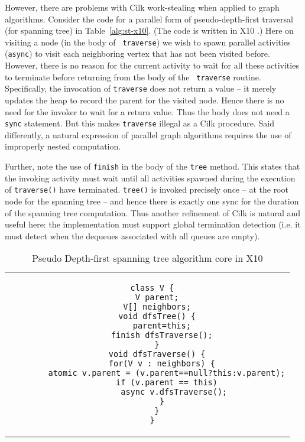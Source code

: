 \documentclass[10pt]{article}
\numberwithin{equation}{section}
\def\Xten{{\sf X10}}
\begin{document}
However, there are problems with Cilk work-stealing when applied to
graph algorithms. Consider the code for a parallel form of
pseudo-depth-first traversal (for spanning tree) in
Table~\ref{alg:st-x10}. (The code is written in \Xten{} \cite{x10}.)
Here on visiting a node (in the body of {\tt
traverse}) we wish to spawn parallel activities ({\tt async}) to visit
each neighboring vertex that has not been visited before. However,
there is no reason for the current activity to wait for all these
activities to terminate before returning from the body of the {\tt
traverse} routine. Specifically, the invocation of {\tt traverse} does
not return a value -- it merely updates the heap to record the parent
for the visited node. Hence there is no need for the invoker to wait
for a return value. Thus the body does not need a {\tt sync}
statement. But this makes {\tt traverse} illegal as a Cilk
procedure. Said differently, a natural expression of parallel graph
algorithms requires the use of improperly nested computation.

Further, note the use of {\tt finish} in the body of the {\tt tree}
method.  This states that the invoking activity must wait until all
activities spawned during the execution of {\tt traverse()} have
terminated. {\tt tree()} is invoked precisely once -- at the root node
for the spanning tree -- and hence there is exactly one sync for the
duration of the spanning tree computation. Thus another refinement of 
Cilk is natural and useful here: the implementation must support 
global termination detection (i.e.{} it must detect when the 
dequeues associated with all queues are empty). 

\begin{table}
\centering
\scriptsize
\begin{tabular}{c}
\begin{minipage}[t]{0.5\textwidth}
\begin{verbatim} 
  class V {
    V parent;
    V[] neighbors;
    void dfsTree() {
      parent=this;
      finish dfsTraverse();
    }
    void dfsTraverse() {
      for(V v : neighbors) {
        atomic v.parent = (v.parent==null?this:v.parent);
        if (v.parent == this)
           async v.dfsTraverse();
      }
    }
  }
\end{verbatim}
\end{minipage} 
\end{tabular}
\caption{Pseudo Depth-first spanning tree algorithm core in \Xten{}}
\label{alg:dfs-x10}
\end{table}
\end{document}
